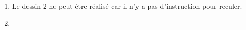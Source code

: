 \begin{enumerate}
\item %
Le dessin 2 ne peut être réalisé car il n'y a pas d'instruction pour reculer.


\item  %


\end{enumerate}
